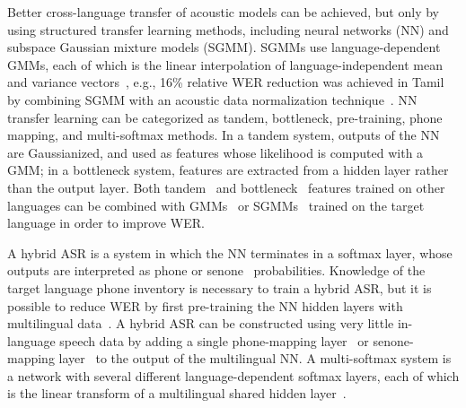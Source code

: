 Better cross-language transfer of acoustic models can be achieved, but
only by using structured transfer learning methods, including neural
networks (NN) and subspace Gaussian mixture models (SGMM).  SGMMs use
language-dependent GMMs, each of which is the linear interpolation of
language-independent mean and variance vectors~\cite{Povey2011}, e.g.,
16\% relative WER reduction was achieved in Tamil by combining SGMM
with an acoustic data normalization technique~\cite{Mohan2014}.  NN
transfer learning can be categorized as tandem, bottleneck,
pre-training, phone mapping, and multi-softmax methods.  In a tandem
system, outputs of the NN are Gaussianized, and used as features whose
likelihood is computed with a GMM; in a
bottleneck system, features are extracted from a hidden layer rather
than the output layer. Both tandem~\cite{Stolcke2006} and
bottleneck~\cite{Vesely2012} features trained on other languages can
be combined with GMMs~\cite{Vesely2012} or SGMMs~\cite{Imseng2014}
trained on the target language in order to improve WER.

A hybrid ASR is a system in which the NN terminates in a softmax
layer, whose outputs are interpreted as phone or
senone~\cite{Dahl2012} probabilities.  Knowledge of the target
language phone inventory is necessary to train a hybrid ASR, but it is
possible to reduce WER by first pre-training the NN hidden layers with
multilingual data~\cite{Huang2013,Swietojanski2012}.  A hybrid ASR can be
constructed using very little in-language speech data by adding a
single phone-mapping layer~\cite{Sim2008} or senone-mapping layer~\cite{Do2012}
to the output of the multilingual NN.  A multi-softmax system
is a network with several different language-dependent softmax
layers, each of which is the linear transform of a multilingual shared
hidden layer~\cite{Huang2013,Scanzio2008,Vesely2012}.

